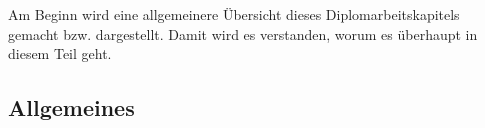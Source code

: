 
\chapter{\docname}
\label{\docname}
Am Beginn wird eine allgemeinere Übersicht dieses Diplomarbeitskapitels gemacht bzw. dargestellt. Damit wird es verstanden, worum es überhaupt in diesem Teil geht.
\section{Allgemeines}


